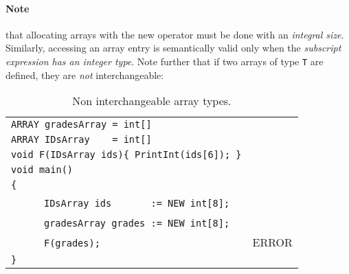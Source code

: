 \documentclass{article}
\begin{document}
\paragraph{Note} that allocating arrays with the new operator
must be done with an \textit{integral size}.
Similarly, accessing an array entry is semantically valid
only when the \textit{subscript expression has an integer type}.
Note further that if two arrays of type \verb"T" are defined,
they are \textit{not} interchangeable:
\begin{table}[h]
\centering
\begin{tabular}{ | l | l | }
\hline
\verb"ARRAY gradesArray = int[]"                 &       \\
\verb"ARRAY IDsArray    = int[]"                 &       \\
\verb"void F(IDsArray ids){ PrintInt(ids[6]); }" &       \\
\verb"void main()"                               &       \\
\verb"{"                                         &       \\
~ ~ ~ ~\verb"IDsArray ids       := NEW int[8];"  &       \\
~ ~ ~ ~\verb"gradesArray grades := NEW int[8];"  &       \\
~ ~ ~ ~\verb"F(grades);"                         & ERROR \\
\verb"}"                                         &       \\
\hline
\end{tabular}
\caption{Non interchangeable array types.
\label{Table_Code_Examples_NULL_Instead_Of_Any_Array}}
\end{table}  
\end{document}
